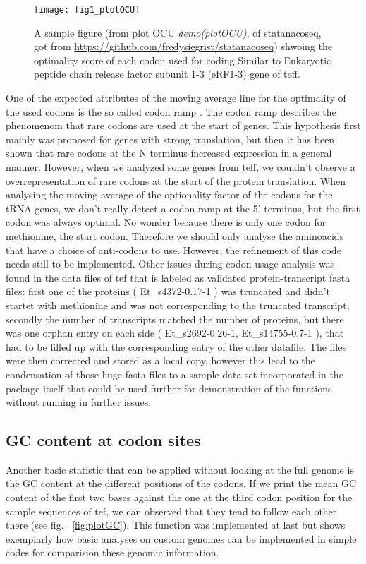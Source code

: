 \begin{figure}[tb] 
\centering 
\texttt{[image: fig1\_plotOCU]} 
\caption[A sample figure from demo plotOCU]{A sample figure (from plot OCU \emph{demo(plotOCU)}, of statanacoseq, got from \url{https://github.com/fredysiegrist/statanacoseq}) shwoing the optimality score of each codon used for coding Similar to Eukaryotic peptide chain release factor subunit 1-3 (eRF1-3) gene of teff.}
\label{fig:plotOCU} 
\end{figure}

One of the expected attributes of the moving average line for the optimality of the used codons is the so called codon ramp \cite{Tuller2010}. The codon ramp describes the phenomenom that rare codons are used at the start of genes. This hypothesis first mainly was proposed for genes with strong translation, but then it has been shown that rare codons at the N terminus increased expression in a general manner. However, when we analyzed some genes from teff, we couldn't observe a overrepresentation of rare codons at the start of the protein translation.  When analysing the moving average of the optionality factor of the codons for the tRNA genes, we don't really detect a codon ramp at the 5' terminus, but the first codon was always optimal. No wonder because there is only one codon for methionine, the start codon. Therefore we should only analyse the aminoacids that have a choice of anti-codons to use. However, the refinement of this code needs still to be implemented.  
Other issues during codon usage analysis was found in the data files of tef that is labeled as validated protein-transcript fasta files: 
first one of the proteins (
Et\_s4372-0.17-1
) was truncated and didn't startet with methionine and was not corresponding to the truncated transcript, secondly the number of transcripts matched the number of proteins, but there was one orphan entry on each side (
Et\_s2692-0.26-1, Et\_s14755-0.7-1
), that had to be filled up with the corresponding entry of the other datafile. 
The files were then corrected and stored as a local copy, however this lead to the condensation of those huge fasta files to a sample data-set incorporated in the package itself that could be used further for demonstration of the functions without running in further issues.

\subsection{GC content at codon sites}
Another basic statistic that can be applied without looking at the full genome is the GC content at the different positions of the codons. If we print the mean GC content of the first two bases against the one at the third codon position for the sample sequences of tef, we can observed that they tend to follow each other there (see fig. ~\ref{fig:plotGC}). This function was implemented at last but shows exemplarly how basic analyses on custom genomes can be implemented in simple codes for comparision these genomic information.

